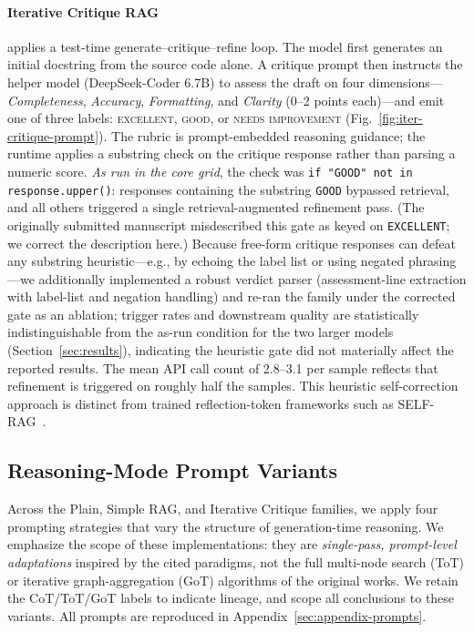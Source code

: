 \documentclass[pdflatex,sn-mathphys-ay]{sn-jnl}%
\theoremstyle{thmstyleone}%
\theoremstyle{thmstyletwo}%
\theoremstyle{thmstylethree}%
\begin{document}
\paragraph{Iterative Critique RAG} applies a test-time generate--critique--refine loop. The model first generates an initial docstring from the source code alone. A critique prompt then instructs the helper model (DeepSeek-Coder 6.7B) to assess the draft on four dimensions---\textit{Completeness}, \textit{Accuracy}, \textit{Formatting}, and \textit{Clarity} (0--2 points each)---and emit one of three labels: \textsc{excellent}, \textsc{good}, or \textsc{needs improvement} (Fig.~\ref{fig:iter-critique-prompt}). The rubric is prompt-embedded reasoning guidance; the runtime applies a substring check on the critique response rather than parsing a numeric score. \emph{As run in the core grid}, the check was \texttt{if "GOOD" not in response.upper()}: responses containing the substring \texttt{GOOD} bypassed retrieval, and all others triggered a single retrieval-augmented refinement pass. (The originally submitted manuscript misdescribed this gate as keyed on \texttt{EXCELLENT}; we correct the description here.) Because free-form critique responses can defeat any substring heuristic---e.g., by echoing the label list or using negated phrasing---we additionally implemented a robust verdict parser (assessment-line extraction with label-list and negation handling) and re-ran the family under the corrected gate as an ablation; trigger rates and downstream quality are statistically indistinguishable from the as-run condition for the two larger models (Section~\ref{sec:results}), indicating the heuristic gate did not materially affect the reported results. The mean API call count of 2.8--3.1 per sample reflects that refinement is triggered on roughly half the samples. This heuristic self-correction approach is distinct from trained reflection-token frameworks such as SELF-RAG~\citep{Asai2023SelfRAGLT}.

\subsection{Reasoning-Mode Prompt Variants}
\label{sec:reasoning-modes}
Across the Plain, Simple RAG, and Iterative Critique families, we apply four prompting strategies that vary the structure of generation-time reasoning. We emphasize the scope of these implementations: they are \emph{single-pass, prompt-level adaptations} inspired by the cited paradigms, not the full multi-node search (ToT) or iterative graph-aggregation (GoT) algorithms of the original works. We retain the CoT/ToT/GoT labels to indicate lineage, and scope all conclusions to these variants. All prompts are reproduced in Appendix~\ref{sec:appendix-prompts}.
\end{document}
